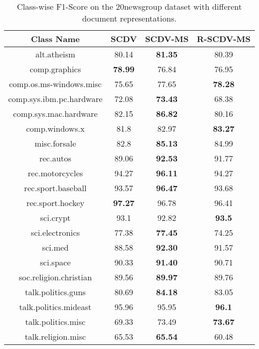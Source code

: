 \documentclass{ecai}
\begin{document}
\begin{table}
\captionsetup{font=small, skip=0pt}
\caption{Class-wise F1-Score on the 20newsgroup dataset with different document representations.}
\small
\begin{center}
\setlength\tabcolsep{2.5pt}
\begin{tabular}{ c|c|c|c }
\hline
{\bf Class Name} & {\bf SCDV} & {\bf SCDV-MS} & {\bf R-SCDV-MS}\\
\hline
alt.atheism & 80.14 &\bf 81.35 & 80.39 \\
comp.graphics &\bf 78.99 & 76.84 & 76.95 \\
comp.os.ms-windows.misc & 75.65 & 77.65 &\bf 78.28 \\
comp.sys.ibm.pc.hardware  & 72.08 &\bf 73.43 & 68.38 \\
comp.sys.mac.hardware & 82.15 &\bf 86.82 & 80.16 \\
comp.windows.x & 81.8 & 82.97 &\bf 83.27 \\
misc.forsale & 82.8 &\bf 85.13 & 84.99 \\
rec.autos & 89.06 &\bf 92.53 &  91.77 \\
rec.motorcycles & 94.27 &\bf 96.11 & 94.27 \\
rec.sport.baseball & 93.57 &\bf 96.47 & 93.68 \\
rec.sport.hockey &\bf 97.27 & 96.78 & 96.41 \\
sci.crypt & 93.1 & 92.82 &\bf 93.5 \\
sci.electronics & 77.38 &\bf 77.45 & 74.25 \\
sci.med & 88.58 &\bf 92.30 & 91.57 \\
sci.space & 90.33 &\bf 91.40 & 90.71 \\
soc.religion.christian & 89.56 &\bf 89.97 & 89.76 \\
talk.politics.guns & 80.69 &\bf 84.18 & 83.05 \\
talk.politics.mideast & 95.96 & 95.95 &\bf 96.1 \\
talk.politics.misc & 69.33 & 73.49 &\bf 73.67 \\
talk.religion.misc & 65.53 &\bf 65.54 & 60.48 \\
\hline
\end{tabular}
\end{center}
\label{table:classwise}
\end{table}
\end{document}
